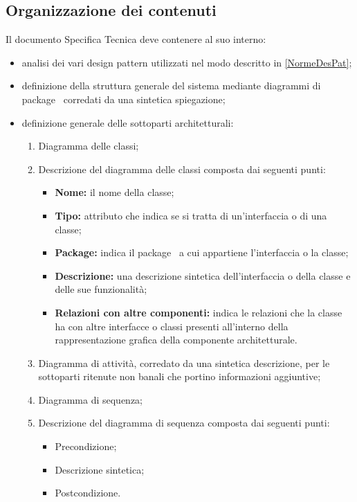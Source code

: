 {\subsection{Organizzazione dei contenuti}{
Il documento Specifica Tecnica deve contenere al suo interno:
\begin{itemize}
	\item analisi dei vari design pattern utilizzati nel modo descritto in \ref{NormeDesPat};
	\item definizione della struttura generale del sistema mediante diagrammi di package\g~ corredati da una sintetica spiegazione;
	\item {definizione generale delle sottoparti architetturali:
		\begin{enumerate}
			\item Diagramma delle classi;
			\item {Descrizione del diagramma delle classi composta dai seguenti punti:
				\begin{itemize}
					\item \textbf{Nome:} il nome della classe;
					\item \textbf{Tipo:} attributo che indica se si tratta di un'interfaccia o di una classe;
					\item \textbf{Package:} indica il package\g~ a cui appartiene l'interfaccia o la classe;
					\item \textbf{Descrizione:} una descrizione sintetica dell'interfaccia o della classe e delle sue funzionalità;
					\item \textbf{Relazioni con altre componenti:} indica le relazioni che la classe ha con altre interfacce o classi presenti all'interno della rappresentazione grafica della componente architetturale.
				\end{itemize}							
			}
			\item Diagramma di attività, corredato da una sintetica descrizione, per le sottoparti ritenute non banali che portino informazioni aggiuntive;
			\item Diagramma di sequenza;
			\item {Descrizione del diagramma di sequenza composta dai seguenti punti:
				\begin{itemize}
					\item Precondizione;
					\item Descrizione sintetica;
					\item Postcondizione.
				\end{itemize}							
			}
		\end{enumerate}
	}
\end{itemize}
}%

}
